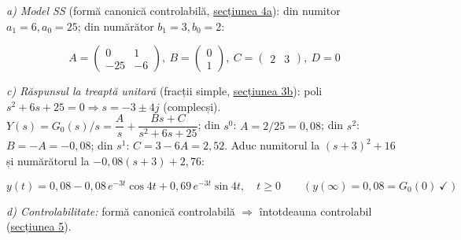 \documentclass[10pt,a4paper]{article}
\begin{document}
\textit{a) Model SS} (formă canonică controlabilă, \hyperref[sec:4]{secțiunea 4a}): din numitor $a_1{=}6,a_0{=}25$; din numărător $b_1{=}3,b_0{=}2$:
\begin{keyeq}\color{red!65!black}
$$A=\begin{pmatrix}0&1\\-25&-6\end{pmatrix},\ B=\begin{pmatrix}0\\1\end{pmatrix},\ C=\begin{pmatrix}2&3\end{pmatrix},\ D=0$$
\end{keyeq}

\textit{c) Răspunsul la treaptă unitară} (fracții simple, \hyperref[sec:3b]{secțiunea 3b}): poli $s^2{+}6s{+}25{=}0\Rightarrow s{=}{-}3{\pm}4j$ (complecși). $Y(s){=}G_0(s)/s{=}\dfrac As+\dfrac{Bs+C}{s^2+6s+25}$; din $s^0$: $A{=}2/25{=}0{,}08$; din $s^2$: $B{=}{-}A{=}{-}0{,}08$; din $s^1$: $C{=}3{-}6A{=}2{,}52$. Aduc numitorul la $(s{+}3)^2{+}16$ și numărătorul la $-0{,}08(s{+}3){+}2{,}76$:
\begin{keyeq}\color{red!65!black}
$$y(t)=0{,}08-0{,}08\,e^{-3t}\cos4t+0{,}69\,e^{-3t}\sin4t,\quad t\ge0\qquad(y(\infty){=}0{,}08{=}G_0(0)\ \checkmark)$$
\end{keyeq}

\textit{d) Controlabilitate:} formă canonică controlabilă $\Rightarrow$ întotdeauna controlabil (\hyperref[sec:5]{secțiunea 5}).
\end{document}
